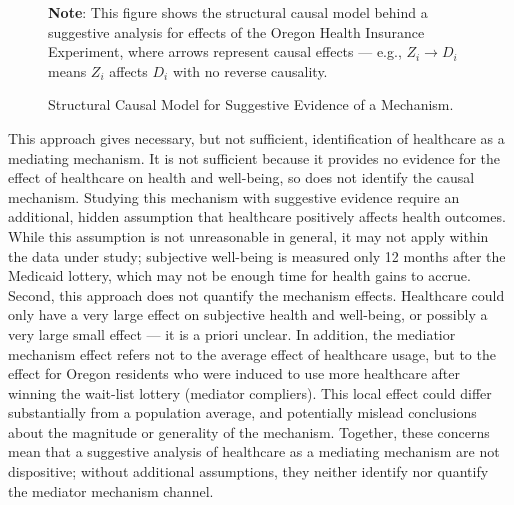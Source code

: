 \begin{figure}[!htbp]
    \centering
    \singlespacing
    \caption{Structural Causal Model for Suggestive Evidence of a Mechanism.}
    \label{fig:scm-health}
    \justify
    \footnotesize
    \textbf{Note}:
    This figure shows the structural causal model behind a suggestive analysis for effects of the Oregon Health Insurance Experiment, where arrows represent causal effects --- e.g., $Z_i \to D_i$ means $Z_i$ affects $D_i$ with no reverse causality.
\end{figure}

This approach gives necessary, but not sufficient, identification of healthcare as a mediating mechanism.
It is not sufficient because it provides no evidence for the effect of healthcare on health and well-being, so does not identify the causal mechanism.
Studying this mechanism with suggestive evidence require an additional, hidden assumption that healthcare positively affects health outcomes.
While this assumption is not unreasonable in general, it may not apply within the data under study; subjective well-being is measured only 12 months after the Medicaid lottery, which may not be enough time for health gains to accrue.
Second, this approach does not quantify the mechanism effects.
Healthcare could only have a very large effect on subjective health and well-being, or possibly a very large small effect --- it is a priori unclear.
In addition, the mediatior mechanism effect refers not to the average effect of healthcare usage, but to the effect for Oregon residents who were induced to use more healthcare after winning the wait-list lottery (mediator compliers).
This local effect could differ substantially from a population average, and potentially mislead conclusions about the magnitude or generality of the mechanism.
Together, these concerns mean that a suggestive analysis of healthcare as a mediating mechanism are not dispositive; without additional assumptions, they neither identify nor quantify the mediator mechanism channel.

